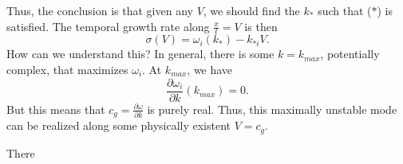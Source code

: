 \documentclass[a4paper]{article}
\begin{document}
Thus, the conclusion is that given any $V$, we should find the $k_*$ such that ($*$) is satisfied. The temporal growth rate along $\frac{x}{t} = V$ is then
\[
  \sigma(V) = \omega_i(k_*) - k_{*i}V.
\]
How can we understand this? In general, there is some $k = k_{max}$, potentially complex, that maximizes $\omega_i$. At $k_{max}$, we have
\[
  \frac{\partial \omega_i}{\partial k}(k_{max}) = 0.
\]
But this means that $c_g = \frac{\partial \omega}{\partial k}$ is purely real. Thus, this maximally unstable mode can be realized along some physically existent $V = c_g$.

There
%
%
%
\end{document}
